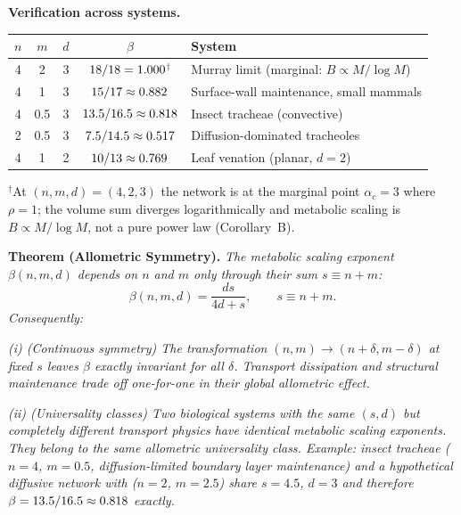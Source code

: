 \documentclass[11pt,a4paper]{article}
\theoremstyle{remark}
\begin{document}
\noindent\textbf{Verification across systems.}

\vspace{0.4em}
\begin{center}
\small
\begin{tabular}{@{}cccc p{5.5cm}@{}}
\toprule
$n$ & $m$ & $d$ & $\beta$ & System \\
\midrule
4 & 2   & 3 & $18/18 = 1.000{}$$^\dagger$    & Murray limit (marginal:
$B \propto M/\log M$) \\
4 & 1   & 3 & $15/17 \approx 0.882{}$    & Surface-wall maintenance,
small mammals \\
4 & 0.5 & 3 & $13.5/16.5 \approx 0.818{}$ & Insect tracheae
(convective) \\
2 & 0.5 & 3 & $7.5/14.5 \approx 0.517{}$  & Diffusion-dominated
tracheoles \\
4 & 1   & 2 & $10/13 \approx 0.769{}$     & Leaf venation (planar,
$d=2$) \\
\bottomrule
\end{tabular}
\vspace{0.2em}

\noindent\small$^\dagger$At $(n,m,d)=(4,2,3)$ the network is at the marginal point $\alpha_c=3$ where $\rho=1$; the volume sum diverges logarithmically and metabolic scaling is $B \propto M/\log M$, not a pure power law (Corollary~B).
\end{center}
\vspace{0.4em}

\vspace{0.5em}
\noindent \textbf{Theorem (Allometric Symmetry).} \textit{The metabolic scaling exponent $\beta(n,m,d)$ depends on $n$ and $m$ only through their sum $s \equiv n+m$:}
\begin{equation}
\beta(n,m,d) = \frac{ds}{4d+s}, \qquad s \equiv n+m.
\end{equation}
\textit{Consequently:}

\textit{(i) (Continuous symmetry) The transformation $(n,m) \to (n+\delta, m-\delta)$ at fixed $s$ leaves $\beta$ exactly invariant for all $\delta$. Transport dissipation and structural maintenance trade off one-for-one in their global allometric effect.}

\textit{(ii) (Universality classes) Two biological systems with the same $(s,d)$ but completely different transport physics have identical metabolic scaling exponents. They belong to the same \emph{allometric universality class}. Example: insect tracheae ($n=4$, $m=0.5$, diffusion-limited boundary layer maintenance) and a hypothetical diffusive network with ($n=2$, $m=2.5$) share $s=4.5$, $d=3$ and therefore $\beta = 13.5/16.5 \approx 0.818{}$ exactly.}
\end{document}
